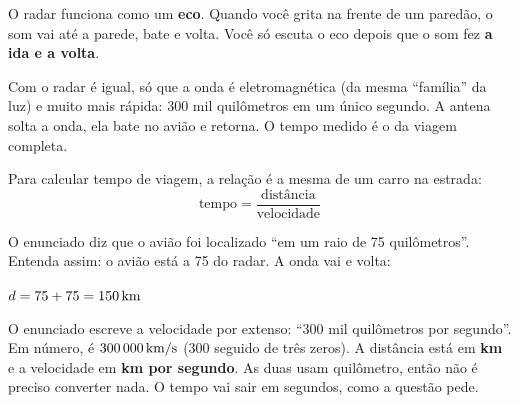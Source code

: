 \begin{enunciado}

\end{enunciado}


\begin{ideia}
O radar funciona como um \textbf{eco}. Quando você grita na frente de um paredão, o som vai até a parede, bate e volta.
Você só escuta o eco depois que o som fez \textbf{a ida e a volta}.

Com o radar é igual, só que a onda é eletromagnética (da mesma ``família'' da luz) e muito mais rápida: 300 mil quilômetros
em um único segundo. A antena solta a onda, ela bate no avião e retorna. O tempo medido é o da viagem completa.

Para calcular tempo de viagem, a relação é a mesma de um carro na estrada:
\[ \text{tempo} = \frac{\text{distância}}{\text{velocidade}} \]

\begin{center}
\end{center}
\end{ideia}

\passoapasso
{}
O enunciado diz que o avião foi localizado ``em um raio de 75 quilômetros''. Entenda assim: o avião está a 75 do radar.
A onda vai e volta:
\begin{conta}
$d = 75 + 75 = 150\,\text{km}$
\end{conta}

O enunciado escreve a velocidade por extenso: ``300 mil quilômetros por segundo''. Em número, é $300\,000\,\text{km/s}$ (300 seguido de três zeros).
A distância está em \textbf{km} e a velocidade em \textbf{km por segundo}. As duas usam quilômetro, então não é preciso
converter nada. O tempo vai sair em segundos, como a questão pede.

